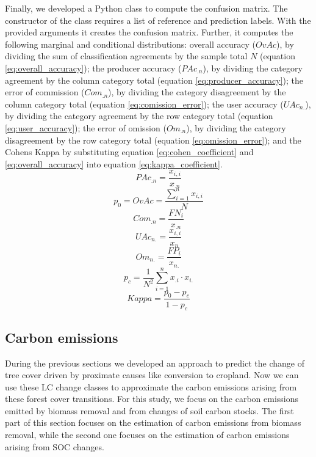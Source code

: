 			Finally, we developed a Python class to compute the confusion matrix. The constructor of the class requires a list of reference and prediction labels. With the provided arguments it creates the confusion matrix. Further, it computes the following marginal and conditional distributions: overall accuracy ($OvAc$), by dividing the sum of classification agreements by the sample total $N$ (equation \ref{eq:overall_accuracy}); the producer accuracy ($PAc_{.n}$), by dividing the category agreement by the column category total (equation \ref{eq:producer_accuracy}); the error of commission ($Com_{.n}$), by dividing the category disagreement by the column category total (equation \ref{eq:comission_error}); the user accuracy ($UAc_{n.}$), by dividing the category agreement by the row category total (equation \ref{eq:user_accuracy}); the error of omission ($Om_{.n}$), by dividing the category disagreement by the row category total (equation \ref{eq:omission_error}); and the Cohens Kappa by substituting equation \ref{eq:cohen_coefficient} and \ref{eq:overall_accuracy} into equation \ref{eq:kappa_coefficient}.
			\begin{equation}
			\label{eq:producer_accuracy}
				PAc_{.n} = \frac{x_{i,i}}{x_{.n}}
			\end{equation}
			\begin{equation}
			\label{eq:overall_accuracy}
				p_0=OvAc = \frac{\displaystyle\sum_{i=1}^{n}x_{i,i}}{N}
			\end{equation}
			\begin{equation}
			\label{eq:comission_error}
				Com_{.n} = \frac{FN_i}{x_{.n}}
			\end{equation}
			\begin{equation}
			\label{eq:user_accuracy}
				UAc_{n.} = \frac{x_{i,i}}{x_{n.}}
			\end{equation}
			\begin{equation}
			\label{eq:omission_error}
				Om_{n.} = \frac{FP_i}{x_{n.}}
			\end{equation}
			\begin{equation}
			\label{eq:cohen_coefficient}
				p_c = \frac{1}{N^2}\displaystyle\sum_{i=1}^{n} x_{.i} \cdot x_{i.}
			\end{equation}
			\begin{equation}
			\label{eq:kappa_coefficient}
				Kappa = \frac{p_0-p_c}{1-p_c}
			\end{equation}

	\subsection{Carbon emissions}
		During the previous sections we developed an approach to predict the change of tree cover driven by proximate causes like conversion to cropland. Now we can use these \ac{LC} change classes to approximate the carbon emissions arising from these forest cover transitions. For this study, we focus on the carbon emissions emitted by biomass removal and from changes of soil carbon stocks. The first part of this section focuses on the estimation of carbon emissions from biomass removal, while the second one focuses on the estimation of carbon emissions arising from \ac{SOC} changes. 

